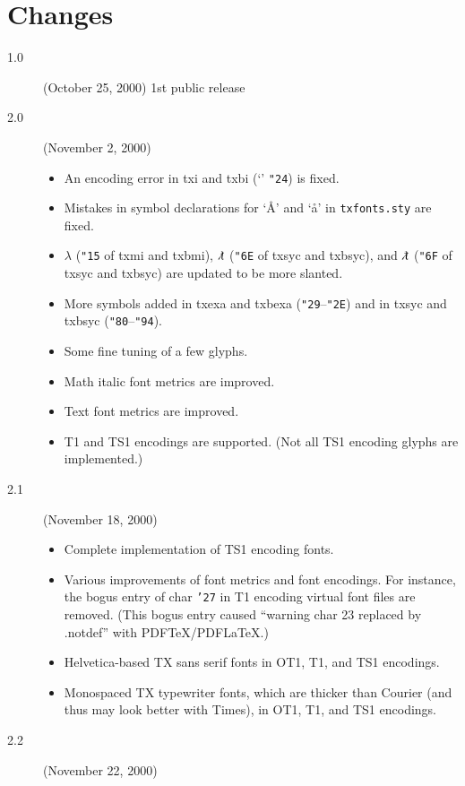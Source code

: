 \documentclass[11pt]{article}
\newcommand{\bs}{\symbol{'134}}
\begin{document}
\section{Changes}

\begin{description}
\item[1.0] (October 25, 2000) 1st public release
\item[2.0] (November 2, 2000)
     \begin{itemize}
     \item An encoding error in txi and txbi (`\textdollar' \texttt{"24}) is fixed.
     \item Mistakes in symbol declarations for `\AA' and `\aa' in \texttt{txfonts.sty}
           are fixed.
     \item $\lambda$ (\texttt{"15} of txmi and txbmi),
           $\lambdaslash$ (\texttt{"6E} of txsyc and txbsyc), and
	 $\lambdabar$ (\texttt{"6F} of txsyc and txbsyc)
	 are updated to be more slanted.
     \item More symbols added in txexa and txbexa (\texttt{"29}--\texttt{"2E})
           and in txsyc and txbsyc (\texttt{"80}--\texttt{"94}).
     \item Some fine tuning of a few glyphs.
     \item Math italic font metrics are improved.
     \item Text font metrics are improved.
     \item T1 and TS1 encodings are supported. (Not all TS1 encoding glyphs are implemented.)
     \end{itemize}
\item[2.1] (November 18, 2000)
     \begin{itemize}
     \item Complete implementation of TS1 encoding fonts.
     \item Various improvements of font metrics and font encodings. For instance,
           the bogus entry of char \texttt{'27} in T1 encoding virtual font files
           are removed. (This bogus entry caused ``warning char 23 replaced
           by \bs.notdef'' with PDF\TeX/PDF\LaTeX.)
     \item Helvetica-based TX sans serif fonts in OT1, T1, and TS1 encodings.
     \item Monospaced TX typewriter fonts, which are thicker than Courier (and thus may look better
           with Times), in OT1, T1, and TS1 encodings.
     \end{itemize}
\item[2.2] (November 22, 2000)

\end{description}
\end{document}

